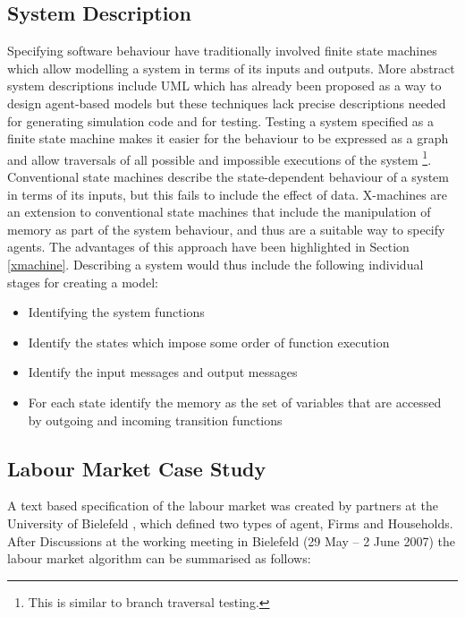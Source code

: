 \documentclass[a4paper,11pt]{article}
\begin{document}
\subsection{System Description}
Specifying software behaviour have traditionally involved finite state
machines which allow modelling a system in terms of its inputs and outputs.
More abstract system descriptions include UML which has already been proposed as a way to design agent-based models \cite{BAUER:2000,BAUER:2001,HUGET:2002,WEISBUCH:2000} but these techniques lack precise descriptions needed for generating simulation code and for testing.
Testing a system specified as a finite state machine makes it easier for the behaviour to be expressed as a graph
and allow traversals of all possible and impossible executions of the system \footnote{This is similar to branch traversal testing.}. Conventional state machines describe the state-dependent behaviour of a system in terms of its inputs, but this fails to include the effect of data.
X-machines are an extension to conventional state machines that
include the manipulation of memory as part of the system behaviour,
and thus are a suitable way to specify agents. The advantages of this
approach have been highlighted in Section \ref{xmachine}. Describing a system would thus include the following individual
stages for creating a model:

\begin{itemize}
\item Identifying the system functions
\item Identify the states which impose some order of function execution
\item Identify the input messages and output messages
\item For each state identify the memory as the set of variables that are accessed by outgoing and incoming transition functions
\end{itemize}

\subsection{Labour Market Case Study}

A text based specification of the labour market was created by partners at the University of Bielefeld \cite{CCGLMARKETS:2007}, which defined two types of agent, Firms and Households. After Discussions at the working meeting in Bielefeld (29 May -- 2 June 2007) the labour market algorithm can be summarised as follows:
\end{document}

